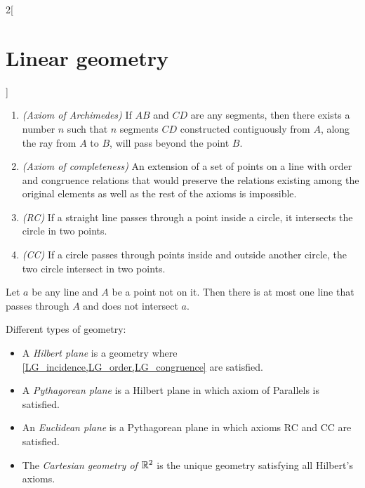 \documentclass[../../../main.tex]{subfiles}
\begin{document}
\begin{multicols}{2}[\section{Linear geometry}]
\begin{axiom}
    \hfill
    \begin{enumerate}
      \item \textit{(Axiom of Archimedes)} If $AB$ and $CD$ are any segments, then there exists a number $n$ such that $n$ segments $CD$ constructed contiguously from $A$, along the ray from $A$ to $B$, will pass beyond the point $B$.
      \item \textit{(Axiom of completeness)} An extension of a set of points on a line with order and congruence relations that would preserve the relations existing among the original elements as well as the rest of the axioms is impossible.
      \item \textit{(RC)} If a straight line passes through a point inside a circle, it intersects the circle in two points.
      \item \textit{(CC)} If a circle passes through points inside and outside another circle, the two circle intersect in two points.
    \end{enumerate}
  \end{axiom}
  \begin{axiom}
    Let $a$ be any line and $A$ be a point not on it. Then there is at most one line that passes through $A$ and does not intersect $a$.
  \end{axiom}
  \begin{definition}
    Different types of geometry:
    \begin{itemize}
      \item A \textit{Hilbert plane} is a geometry where \cref{LG_incidence,LG_order,LG_congruence} are satisfied.
      \item A \textit{Pythagorean plane} is a Hilbert plane in which axiom of Parallels is satisfied.
      \item An \textit{Euclidean plane} is a Pythagorean plane in which axioms RC and CC are satisfied.
      \item The \textit{Cartesian geometry of $\mathbb{R}^2$} is the unique geometry satisfying all Hilbert's axioms.
    \end{itemize}
  \end{definition}

\end{multicols}
\end{document}
